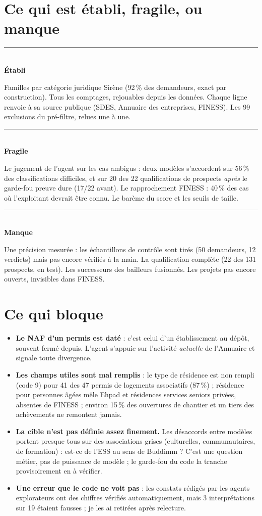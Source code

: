 \documentclass[10pt,a4paper]{article}
\newcommand{\bilan}[3]{\begin{minipage}[t]{.315\linewidth}
  {\color{#1}\rule{\linewidth}{1.6pt}}\\[1pt]
  {\sffamily\bfseries\small\color{#1}#2}\\[1pt]
  {\footnotesize\raggedright #3\par}\end{minipage}}
\begin{document}
\section{Ce qui est établi, fragile, ou manque}
\noindent\bilan{vert}{Établi}{Familles par catégorie juridique Sirène (92\,\% des demandeurs, exact par construction). Tous les comptages,
  rejouables depuis les données. Chaque ligne renvoie à sa source publique (SDES, Annuaire des entreprises, FINESS).
  Les 99 exclusions du pré-filtre, relues une à une.}\hfill
\bilan{orange}{Fragile}{Le jugement de l'agent sur les cas ambigus : deux modèles s'accordent sur 56\,\% des classifications difficiles,
  et sur 20 des 22 qualifications de prospects \emph{après} le garde-fou \og preuve dure\fg{} (17/22 avant). Le rapprochement FINESS :
  40\,\% des cas où l'exploitant devrait être connu. Le barème du score et les seuils de taille.}\hfill
\bilan{rouge}{Manque}{Une précision mesurée : les échantillons de contrôle sont tirés (50 demandeurs, 12 verdicts) mais pas encore
  vérifiés à la main. La qualification complète (22 des 131 prospects, en test). Les successeurs des bailleurs fusionnés.
  Les projets pas encore ouverts, invisibles dans FINESS.}

\section{Ce qui bloque}
\begin{itemize}
\item \textbf{Le NAF d'un permis est daté} : c'est celui d'un établissement au dépôt, souvent fermé depuis. L'agent s'appuie sur
  l'activité \emph{actuelle} de l'Annuaire et signale toute divergence.
\item \textbf{Les champs utiles sont mal remplis} : le type de résidence est \og non rempli\fg{} (code 9) pour 41 des 47 permis de
  logements associatifs (87\,\%) ; \og résidence pour personnes âgées\fg{} mêle Ehpad et résidences services seniors privées, absentes
  de FINESS ; environ 15\,\% des ouvertures de chantier et un tiers des achèvements ne remontent jamais.
\item \textbf{La cible n'est pas définie assez finement.} Les désaccords entre modèles portent presque tous sur des associations
  \og grises\fg{} (culturelles, communautaires, de formation) : est-ce de l'ESS au sens de Buddimm ? C'est une question métier, pas
  de puissance de modèle ; le garde-fou du code la tranche provisoirement en \og à vérifier\fg{}.
\item \textbf{Une erreur que le code ne voit pas} : les constats rédigés par les agents explorateurs ont des chiffres vérifiés
  automatiquement, mais 3 interprétations sur 19 étaient fausses ; je les ai retirées après relecture.
\end{itemize}
\end{document}
